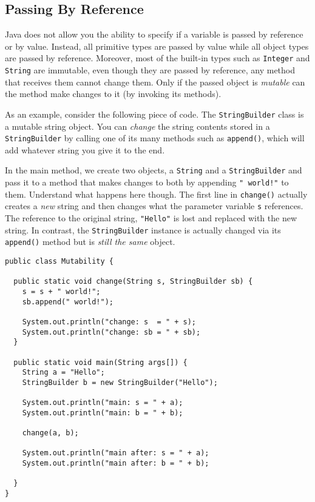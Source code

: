 \subsection{Passing By Reference}

Java does not allow you the ability to specify if a variable
is passed by reference or by value.  Instead, all primitive types
are passed by value while all object types are passed by 
reference.  Moreover, most of the built-in types such as 
\texttt{Integer} and \texttt{String} are
immutable, even though they are passed by reference, any
method that receives them cannot change them.  Only
if the passed object is \emph{mutable} can the method
make changes to it (by invoking its methods).  

As an example, consider the following piece of code.  The
\texttt{StringBuilder} class is a mutable string
object.  You can \emph{change} the string contents stored
in a \texttt{StringBuilder} by calling one of its
many methods such as \texttt{append()}, which
will add whatever string you give it to the end.

In the main method, we create two objects, a 
\texttt{String} and a \texttt{StringBuilder}
and pass it to a method that makes changes to both by
appending \texttt{" world!"} to them.  Understand
what happens here though.  The first line in \texttt{change()}
actually creates a \emph{new} string and then changes
what the parameter variable \texttt{s} references.
The reference to the original string, \texttt{"Hello"} is lost and
replaced with the new string.  In contrast, the \texttt{StringBuilder}
instance is actually changed via its \texttt{append()}
method but is \emph{still the same} object.

\begin{verbatim}
public class Mutability {
  
  public static void change(String s, StringBuilder sb) {    
    s = s + " world!";
    sb.append(" world!");
    
    System.out.println("change: s  = " + s);
    System.out.println("change: sb = " + sb);
  }

  public static void main(String args[]) {
    String a = "Hello";
    StringBuilder b = new StringBuilder("Hello");

    System.out.println("main: s = " + a);
    System.out.println("main: b = " + b);
    
    change(a, b);

    System.out.println("main after: s = " + a);
    System.out.println("main after: b = " + b);

  }
}
\end{verbatim}

